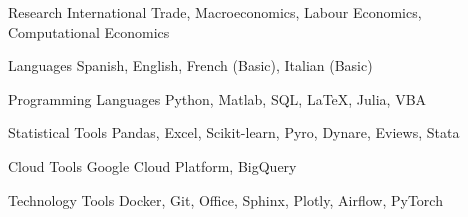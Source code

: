 

\begin{cvskills}

\cvskill
    {Research} %
    {International Trade, Macroeconomics, Labour Economics, Computational Economics} %

\cvskill
    {Languages} %
    {Spanish, English, French (Basic), Italian (Basic)} %

\cvskill
    {Programming Languages} %
    {Python, Matlab, SQL, LaTeX, Julia, VBA} %

\cvskill
    {Statistical Tools} %
    {Pandas, Excel, Scikit-learn, Pyro, Dynare, Eviews, Stata} %

\cvskill
    {Cloud Tools} %
    {Google Cloud Platform, BigQuery} %

\cvskill
    {Technology Tools} %
    {Docker, Git, Office, Sphinx, Plotly, Airflow, PyTorch} %

\end{cvskills}


